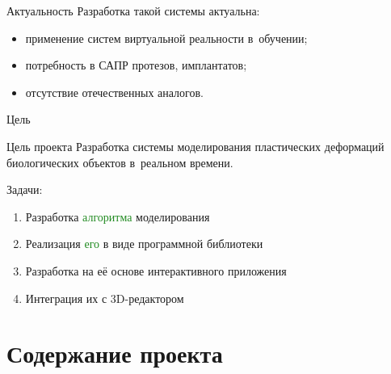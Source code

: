 \documentclass[usenames,dvipsnames,pdftex,unicode,hidelinks]{beamer}
\newcommand{\grn}[1]{\textcolor{ForestGreen}{#1}}
\newcommand{\ppl}[1]{\textcolor{RoyalPurple}{#1}}
\newcommand{\blu}[1]{\textcolor{NavyBlue}{#1}}
\begin{document}
  \begin{frame}{Актуальность}
    Разработка такой системы актуальна:
    \begin{itemize}
      \item применение систем виртуальной реальности \alert{в~обучении};
      \item потребность в \alert{САПР} протезов, имплантатов;
      \item отсутствие \alert{отечественных} аналогов.
    \end{itemize}

    \vspace{0.5cm}

  \end{frame}

  \begin{frame}{Цель}
    \begin{block}{Цель проекта}
      Разработка \alert{системы моделирования} пластических деформаций биологических объектов
      \alert{в~реальном времени}.
    \end{block}

    \vspace{0.5cm}

    Задачи:
    \begin{enumerate}
      \item Разработка \grn{алгоритма} моделирования
      \item Реализация \grn{его} в виде \ppl{программной библиотеки}
      \item Разработка на \ppl{её} основе \blu{интерактивного приложения}
      \item<new@1-> Интеграция \ppl{и}\blu{х} с 3D-редактором
    \end{enumerate}
  \end{frame}

  \section{Содержание проекта}
\end{document}
